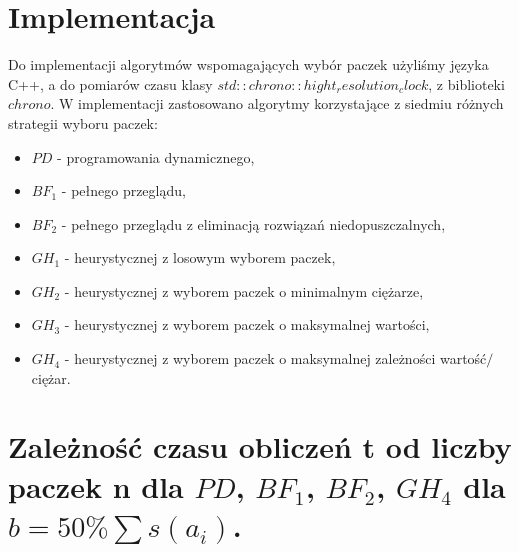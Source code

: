 \documentclass[polish,polish,a4paper]{article}
\begin{document}
\begin{spacing}{1.35}
	
	\section{Implementacja}
	
	Do implementacji algorytmów wspomagających wybór paczek użyliśmy języka C++, a do pomiarów czasu klasy $std::chrono::hight_resolution_clock$, z biblioteki $chrono$. W implementacji zastosowano algorytmy korzystające z  siedmiu różnych strategii wyboru paczek:
	\begin{itemize}
		\item $PD$ - programowania dynamicznego,
		\item $BF_{1}$ - pełnego przeglądu,
		\item $BF_{2}$ - pełnego przeglądu z eliminacją rozwiązań niedopuszczalnych,
		\item $GH_{1}$ - heurystycznej z losowym wyborem paczek,
		\item $GH_{2}$ - heurystycznej z wyborem paczek o minimalnym ciężarze,
		\item $GH_{3}$ - heurystycznej z wyborem paczek o maksymalnej wartości,
		\item $GH_{4}$ - heurystycznej z wyborem paczek o maksymalnej zależności wartość$/$ciężar.  
	\end{itemize}
	
	
	
	\section{Zależność czasu obliczeń t od liczby paczek n dla $PD$, $BF_{1}$, $BF_{2}$, $GH_{4}$ dla $b = 50 \% \sum s (a_{i})$. }
	
		\begin{figure}[H]
		\centering

\end{figure}
\end{spacing}
\end{document}
